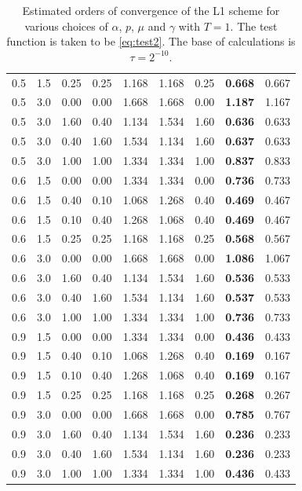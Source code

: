 \documentclass[12pt,a4paper]{article}
\theoremstyle{definition}
\begin{document}
\begin{table}[h]
\begin{tabular}{ccccccccc}
0.5 & 1.5 & 0.25 & 0.25 & 1.168 & 1.168 & 0.25 & \textbf{0.668} & 0.667 \\
0.5 & 3.0 & 0.00 & 0.00 & 1.668 & 1.668 & 0.00 & \textbf{1.187} & 1.167 \\
0.5 & 3.0 & 1.60 & 0.40 & 1.134 & 1.534 & 1.60 & \textbf{0.636} & 0.633 \\
0.5 & 3.0 & 0.40 & 1.60 & 1.534 & 1.134 & 1.60 & \textbf{0.637} & 0.633 \\
0.5 & 3.0 & 1.00 & 1.00 & 1.334 & 1.334 & 1.00 & \textbf{0.837} & 0.833 \\
\hline
0.6 & 1.5 & 0.00 & 0.00 & 1.334 & 1.334 & 0.00 & \textbf{0.736} & 0.733 \\
0.6 & 1.5 & 0.40 & 0.10 & 1.068 & 1.268 & 0.40 & \textbf{0.469} & 0.467 \\
0.6 & 1.5 & 0.10 & 0.40 & 1.268 & 1.068 & 0.40 & \textbf{0.469} & 0.467 \\
0.6 & 1.5 & 0.25 & 0.25 & 1.168 & 1.168 & 0.25 & \textbf{0.568} & 0.567 \\
0.6 & 3.0 & 0.00 & 0.00 & 1.668 & 1.668 & 0.00 & \textbf{1.086} & 1.067 \\
0.6 & 3.0 & 1.60 & 0.40 & 1.134 & 1.534 & 1.60 & \textbf{0.536} & 0.533 \\
0.6 & 3.0 & 0.40 & 1.60 & 1.534 & 1.134 & 1.60 & \textbf{0.537} & 0.533 \\
0.6 & 3.0 & 1.00 & 1.00 & 1.334 & 1.334 & 1.00 & \textbf{0.736} & 0.733 \\
\hline
0.9 & 1.5 & 0.00 & 0.00 & 1.334 & 1.334 & 0.00 & \textbf{0.436} & 0.433 \\
0.9 & 1.5 & 0.40 & 0.10 & 1.068 & 1.268 & 0.40 & \textbf{0.169} & 0.167 \\
0.9 & 1.5 & 0.10 & 0.40 & 1.268 & 1.068 & 0.40 & \textbf{0.169} & 0.167 \\
0.9 & 1.5 & 0.25 & 0.25 & 1.168 & 1.168 & 0.25 & \textbf{0.268} & 0.267 \\
0.9 & 3.0 & 0.00 & 0.00 & 1.668 & 1.668 & 0.00 & \textbf{0.785} & 0.767 \\
0.9 & 3.0 & 1.60 & 0.40 & 1.134 & 1.534 & 1.60 & \textbf{0.236} & 0.233 \\
0.9 & 3.0 & 0.40 & 1.60 & 1.534 & 1.134 & 1.60 & \textbf{0.236} & 0.233 \\
0.9 & 3.0 & 1.00 & 1.00 & 1.334 & 1.334 & 1.00 & \textbf{0.436} & 0.433 \\
\hline
\end{tabular}
\caption{Estimated orders of convergence of the L1 scheme for various choices of $\alpha$, $p$, $\mu$ and $\gamma$ with $T = 1$. The test function is taken to be \eqref{eq:test2}. The base of calculations is $\tau = 2^{-10}$.}
\label{tab:tab2}
\end{table}
\end{document}
